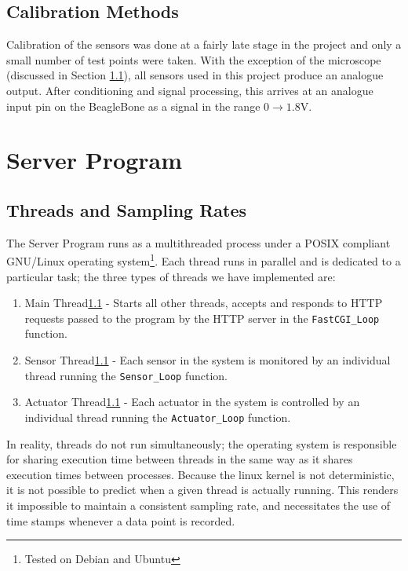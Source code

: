 \subsection{Calibration Methods}

Calibration of the sensors was done at a fairly late stage in the project and only a small number of test points were taken. With the exception of the microscope (discussed in Section \ref{}), all sensors used in this project produce an analogue output. After conditioning and signal processing, this arrives at an analogue input pin on the BeagleBone as a signal in the range $0\to1.8\text{V}$. 


\section{Server Program}


\subsection{Threads and Sampling Rates}

The Server Program runs as a multithreaded process under a POSIX compliant GNU/Linux operating system\footnote{Tested on Debian and Ubuntu}. Each thread runs in parallel and is dedicated to a particular task; the three types of threads we have implemented are:
\begin{enumerate}
  \item Main Thread\ref{} - Starts all other threads, accepts and responds to HTTP requests passed to the program by the HTTP server in the \verb/FastCGI_Loop/ function.
  \item Sensor Thread\ref{} - Each sensor in the system is monitored by an individual thread running the \verb/Sensor_Loop/ function.
  \item Actuator Thread\ref{} - Each actuator in the system is controlled by an individual thread running the \verb/Actuator_Loop/ function.
\end{enumerate}


In reality, threads do not run simultaneously; the operating system is responsible for sharing execution time between threads in the same way as it shares execution times between processes. Because the linux kernel is not deterministic, it is not possible to predict when a given thread is actually running. This renders it impossible to maintain a consistent sampling rate, and necessitates the use of time stamps whenever a data point is recorded. 

